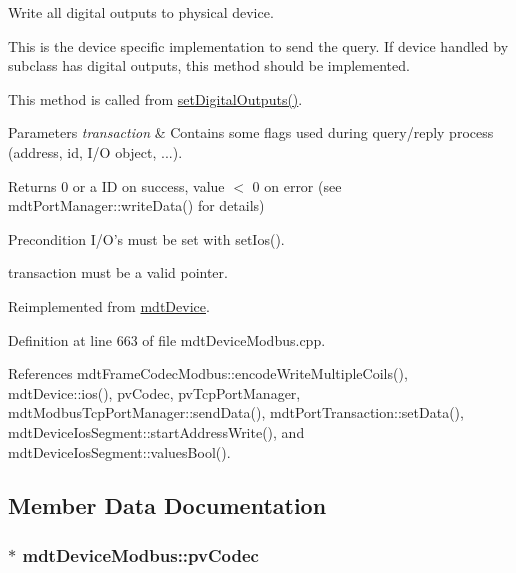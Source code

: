 Write all digital outputs to physical device. 

This is the device specific implementation to send the query. If device handled by subclass has digital outputs, this method should be implemented.

This method is called from \hyperlink{classmdt_device_a7b86a816e55a91f0d62426e1741437c6}{set\-Digital\-Outputs()}.


\begin{DoxyParams}{Parameters}
{\em transaction} & Contains some flags used during query/reply process (address, id, I/\-O object, ...). \\
\hline
\end{DoxyParams}
\begin{DoxyReturn}{Returns}
0 or a I\-D on success, value $<$ 0 on error (see mdt\-Port\-Manager\-::write\-Data() for details) 
\end{DoxyReturn}
\begin{DoxyPrecond}{Precondition}
I/\-O's must be set with set\-Ios(). 

transaction must be a valid pointer. 
\end{DoxyPrecond}


Reimplemented from \hyperlink{classmdt_device_ae644ab1ef0ebb57d6d9d502829907ec1}{mdt\-Device}.



Definition at line 663 of file mdt\-Device\-Modbus.\-cpp.



References mdt\-Frame\-Codec\-Modbus\-::encode\-Write\-Multiple\-Coils(), mdt\-Device\-::ios(), pv\-Codec, pv\-Tcp\-Port\-Manager, mdt\-Modbus\-Tcp\-Port\-Manager\-::send\-Data(), mdt\-Port\-Transaction\-::set\-Data(), mdt\-Device\-Ios\-Segment\-::start\-Address\-Write(), and mdt\-Device\-Ios\-Segment\-::values\-Bool().



\subsection{Member Data Documentation}
\hypertarget{classmdt_device_modbus_a2171d37ea720d546934f1c841e3c4d26}{
\subsubsection[{pv\-Codec}]{$\ast$ mdt\-Device\-Modbus\-::pv\-Codec\hspace{0.3cm}{\ttfamily [protected]}}}\label{classmdt_device_modbus_a2171d37ea720d546934f1c841e3c4d26}


